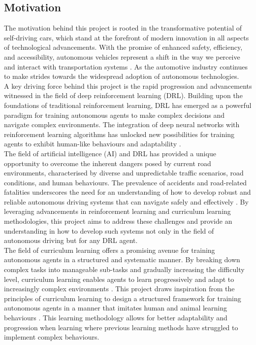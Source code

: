\documentclass{article}
\begin{document}
\subsection{Motivation}
The motivation behind this project is rooted in the transformative potential of self-driving cars, which stand at the forefront of modern innovation in all aspects of technological advancements. With the promise of enhanced safety, efficiency, and accessibility, autonomous vehicles represent a shift in the way we perceive and interact with transportation systems \cite{mckinsey_autonomous_vehicles}. As the automotive industry continues to make strides towards the widespread adoption of autonomous technologies.\\

A key driving force behind this project is the rapid progression and advancements witnessed in the field of deep reinforcement learning (DRL). Building upon the foundations of traditional reinforcement learning, DRL has emerged as a powerful paradigm for training autonomous agents to make complex decisions and navigate complex environments. The integration of deep neural networks with reinforcement learning algorithms has unlocked new possibilities for training agents to exhibit human-like behaviours and adaptability \cite{robust_deep_learning}.\\

The field of artificial intelligence (AI) and DRL has provided a unique opportunity to overcome the inherent dangers posed by current road environments, characterised by diverse and unpredictable traffic scenarios, road conditions, and human behaviours. The prevalence of accidents and road-related fatalities underscores the need for an understanding of how to develop robust and reliable autonomous driving systems that can navigate safely and effectively \cite{junction_driving}. By leveraging advancements in reinforcement learning and curriculum learning methodologies, this project aims to address these challenges and provide an understanding in how to develop such systems not only in the field of autonomous driving but for any DRL agent.\\

The field of curriculum learning offers a promising avenue for training autonomous agents in a structured and systematic manner. By breaking down complex tasks into manageable sub-tasks and gradually increasing the difficulty level, curriculum learning enables agents to learn progressively and adapt to increasingly complex environments \cite{automatic_curriculum}. This project draws inspiration from the principles of curriculum learning to design a structured framework for training autonomous agents in a manner that imitates human and animal learning behaviours \cite{human_curriculum_learning}. This learning methodology allows for better adaptability and progression when learning where previous learning methods have struggled to implement complex behaviours. \\
\end{document}

